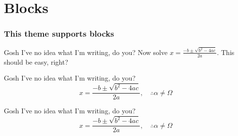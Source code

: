 \documentclass[font-size=12pt]{ltx-talk}
\begin{document}
\section{Blocks}



\begin{frame}[allowframebreaks]
\frametitle{This theme supports blocks}

    \begin{exampleblock}{Gosh I've no idea what I'm writing, do you?}
    Now solve $x = \frac{-b \pm \sqrt{b^2 - 4ac}}{2a}$. This should be easy, right?
    \end{exampleblock}

    \begin{alertblock}{Gosh I've no idea what I'm writing, do you?}
    \setlength{\abovedisplayshortskip}{-1em}
    \[ x = \frac{-b \pm \sqrt{b^2 - 4ac}}{2a}, \quad\therefore \alpha \neq \Omega \]
    \end{alertblock}

    \begin{block}{Gosh I've no idea what I'm writing, do you?}
    \setlength{\abovedisplayshortskip}{-1em}
    \[ x = \frac{-b \pm \sqrt{b^2 - 4ac}}{2a}, \quad\therefore \alpha \neq \Omega \]
    \end{block}


    
\end{frame}
\end{document}
